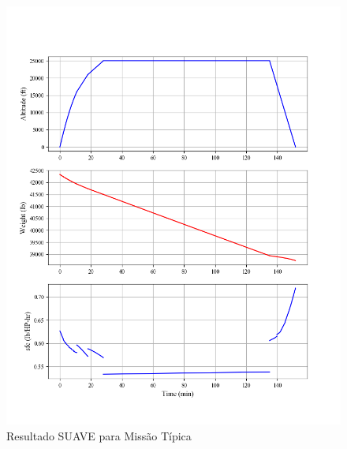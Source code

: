 \begin{figure}[H]
\centering
\includegraphics[width=1.\textwidth]{images/parte4/mission0.png}
\caption{Resultado SUAVE para Missão Típica}
\label{fig:mission_mission}
\end{figure}

